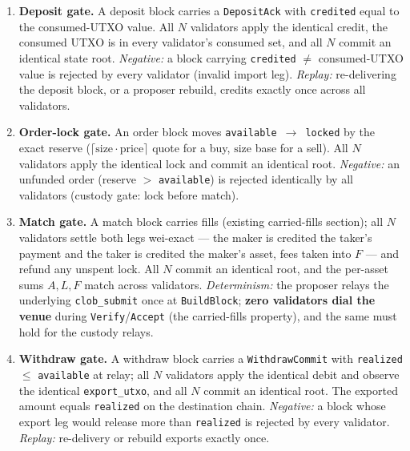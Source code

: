 \begin{enumerate}[leftmargin=2em]
\item \textbf{Deposit gate.} A deposit block carries a
  \texttt{DepositAck} with \texttt{credited} equal to the consumed-UTXO
  value. All $N$ validators apply the identical credit, the consumed
  UTXO is in every validator's consumed set, and all $N$ commit an
  identical state root. \emph{Negative:} a block carrying
  \texttt{credited} $\ne$ consumed-UTXO value is rejected by every
  validator (invalid import leg). \emph{Replay:} re-delivering the
  deposit block, or a proposer rebuild, credits exactly once across all
  validators.

\item \textbf{Order-lock gate.} An order block moves
  \texttt{available}~$\to$~\texttt{locked} by the exact reserve
  ($\lceil \mathrm{size}\cdot\mathrm{price}\rceil$ quote for a buy,
  $\mathrm{size}$ base for a sell). All $N$ validators apply the
  identical lock and commit an identical root. \emph{Negative:} an
  unfunded order (reserve $>$ \texttt{available}) is rejected
  identically by all validators (custody gate: lock before match).

\item \textbf{Match gate.} A match block carries fills (existing
  carried-fills section); all $N$ validators settle both legs wei-exact
  --- the maker is credited the taker's payment and the taker is
  credited the maker's asset, fees taken into $F$ --- and refund any
  unspent lock. All $N$ commit an identical root, and the per-asset sums
  $A, L, F$ match across validators. \emph{Determinism:} the proposer
  relays the underlying \texttt{clob\_submit} once at
  \texttt{BuildBlock}; \textbf{zero validators dial the venue} during
  \texttt{Verify}/\texttt{Accept} (the carried-fills property), and the
  same must hold for the custody relays.

\item \textbf{Withdraw gate.} A withdraw block carries a
  \texttt{WithdrawCommit} with \texttt{realized} $\le$
  \texttt{available} at relay; all $N$ validators apply the identical
  debit and observe the identical \texttt{export\_utxo}, and all $N$
  commit an identical root. The exported amount equals \texttt{realized}
  on the destination chain. \emph{Negative:} a block whose export leg
  would release more than \texttt{realized} is rejected by every
  validator. \emph{Replay:} re-delivery or rebuild exports exactly once.
\end{enumerate}

